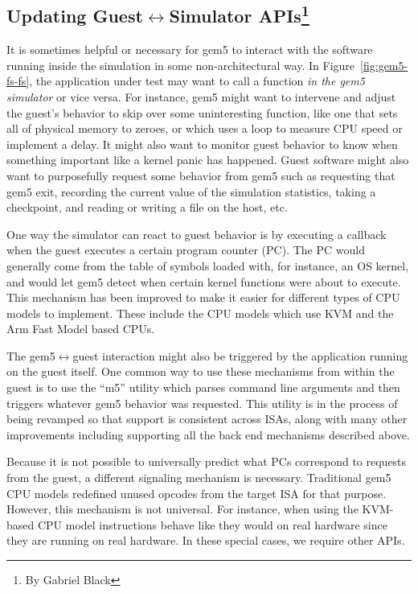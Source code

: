 \subsection[Updating Guest<->Simulator APIs]{Updating Guest$\leftrightarrow$Simulator APIs\footnote{By Gabriel Black}}
\label{sec:guest-sim}

It is sometimes helpful or necessary for gem5 to interact with the software running inside the simulation in some non-architectural way.
In Figure~\ref{fig:gem5-fs-fs}, the application under test may want to call a function \emph{in the gem5 simulator} or vice versa.
For instance, gem5 might want to intervene and adjust the guest's behavior to skip over some uninteresting function, like one that sets all of physical memory to zeroes, or which uses a loop to measure CPU speed or implement a delay.
It might also want to monitor guest behavior to know when something important like a kernel panic has happened.
Guest software might also want to purposefully request some behavior from gem5 such as requesting that gem5 exit, recording the current value of the simulation statistics, taking a checkpoint,  and reading or writing a file on the host, etc.

One way the simulator can react to guest behavior is by executing a callback when the guest executes a certain program counter (PC).
The PC would generally come from the table of symbols loaded with, for instance, an OS kernel, and would let gem5 detect when certain kernel functions were about to execute.
This mechanism has been improved to make it easier for different types of CPU models to implement.
These include the CPU models which use KVM and the Arm Fast Model based CPUs.

The gem5$\leftrightarrow$guest interaction might also be triggered by the application running on the guest itself.
One common way to use these mechanisms from within the guest is to use the ``m5'' utility which parses command line arguments and then triggers whatever gem5 behavior was requested.
This utility is in the process of being revamped so that support is consistent across ISAs, along with many other improvements including supporting all the back end mechanisms described above.

Because it is not possible to universally predict what PCs correspond to requests from the guest, a different signaling mechanism is necessary.
Traditional gem5 CPU models redefined unused opcodes from the target ISA for that purpose.
However, this mechanism is not universal.
For instance, when using the KVM-based CPU model instructions behave like they would on real hardware since they are running on real hardware.
In these special cases, we require other APIs.

